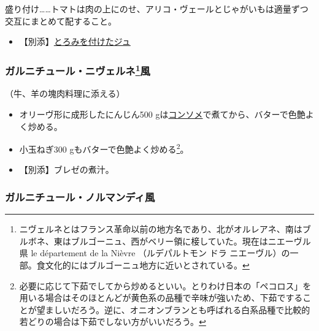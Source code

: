 \begin{recette}
盛り付け\ldots{}\ldots{}トマトは肉の上にのせ、アリコ・ヴェールとじゃがいもは適量ずつ交互にまとめて配すること。

\begin{itemize}
\tightlist
\item
  【別添】\protect\hyperlink{jus-de-veau-lie}{とろみを付けたジュ}
\end{itemize}

\atoaki{}

\hypertarget{garniture-a-la-nivernaise}{%
\subsubsection[ガルニチュール・ニヴェルネ風]{\texorpdfstring{ガルニチュール・ニヴェルネ\footnote{ニヴェルネとはフランス革命以前の地方名であり、北がオルレアネ、南はブルボネ、東はブルゴーニュ、西がベリー領に椄していた。現在はニエーヴル県
  le département de la Nièvre （ルデパルトモン ドラ
  ニエーヴル）の一部。食文化的にはブルゴーニュ地方に近いとされている。}風}{ガルニチュール・ニヴェルネ風}}\label{garniture-a-la-nivernaise}}



（牛、羊の塊肉料理に添える）

\begin{itemize}
\item
  オリーヴ形に成形したにんじん500
  gは\protect\hyperlink{consomme-blanc-simple}{コンソメ}で煮てから、バターで色艶よく炒める。
\item
  小玉ねぎ300 gもバターで色艶よく炒める\footnote{必要に応じて下茹でしてから炒めるといい。とりわけ日本の「ペコロス」を用いる場合はそのほとんどが黄色系の品種で辛味が強いため、下茹ですることが望ましいだろう。逆に、オニオンブランとも呼ばれる白系品種で比較的若どりの場合は下茹でしない方がいいだろう。}。
\item
  【別添】ブレゼの煮汁。
\end{itemize}

\atoaki{}

\hypertarget{garniture-a-la-normande}{%
\subsubsection{ガルニチュール・ノルマンディ風}\label{garniture-a-la-normande}}


\end{recette}
